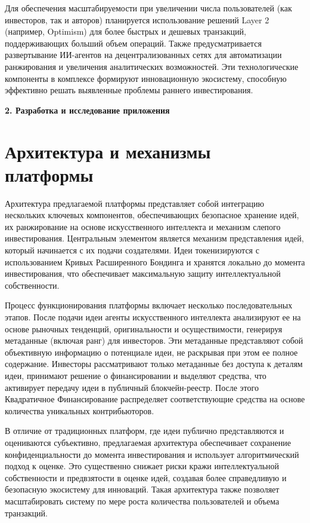 \documentclass[
    candidate, %
    subf, %
]{disser}
\begin{document}
Для обеспечения масштабируемости при увеличении числа пользователей (как инвесторов, так и авторов) планируется использование решений Layer 2 (например, Optimism) для более быстрых и дешевых транзакций, поддерживающих больший объем операций. Также предусматривается развертывание ИИ-агентов на децентрализованных сетях для автоматизации ранжирования и увеличения аналитических возможностей. Эти технологические компоненты в комплексе формируют инновационную экосистему, способную эффективно решать выявленные проблемы раннего инвестирования.

\newpage
\begin{center}
  \textbf{\large 2. Разработка и исследование приложения }
\end{center}

\section{Архитектура и механизмы платформы}

Архитектура предлагаемой платформы представляет собой интеграцию нескольких ключевых компонентов, обеспечивающих безопасное хранение идей, их ранжирование на основе искусственного интеллекта и механизм слепого инвестирования. Центральным элементом является механизм представления идей, который начинается с их подачи создателями. Идеи токенизируются с использованием Кривых Расширенного Бондинга и хранятся локально до момента инвестирования, что обеспечивает максимальную защиту интеллектуальной собственности.

Процесс функционирования платформы включает несколько последовательных этапов. После подачи идеи агенты искусственного интеллекта анализируют ее на основе рыночных тенденций, оригинальности и осуществимости, генерируя метаданные (включая ранг) для инвесторов. Эти метаданные представляют собой объективную информацию о потенциале идеи, не раскрывая при этом ее полное содержание. Инвесторы рассматривают только метаданные без доступа к деталям идеи, принимают решение о финансировании и выделяют средства, что активирует передачу идеи в публичный блокчейн-реестр. После этого Квадратичное Финансирование распределяет соответствующие средства на основе количества уникальных контрибьюторов.

В отличие от традиционных платформ, где идеи публично представляются и оцениваются субъективно, предлагаемая архитектура обеспечивает сохранение конфиденциальности до момента инвестирования и использует алгоритмический подход к оценке. Это существенно снижает риски кражи интеллектуальной собственности и предвзятости в оценке идей, создавая более справедливую и безопасную экосистему для инноваций. Такая архитектура также позволяет масштабировать систему по мере роста количества пользователей и объема транзакций.
\end{document}

